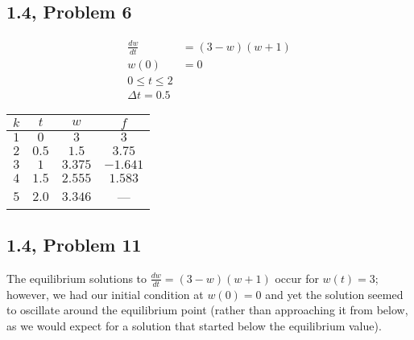 \documentclass[10pt]{mypackage}
\begin{document}
\subsection{1.4, Problem 6}%
\begin{align*}
  \frac{dw}{dt} &= (3-w)(w+1)\\
  w(0) &= 0\\
  0 \leq t \leq 2\\
  \Delta t = 0.5
\end{align*}
\begin{center}
  \begin{tabular}{c|c|c|c}
    $k$ & $t$ & $w$ & $f$\\
    \hline
    $1$ & $0$ & $3$ & $3$\\
    $2$ & $0.5$ & $1.5$ & $3.75$\\
    $3$ & $1$ & $3.375$ & $-1.641$\\
    $4$ & $1.5$ & $2.555$ & $1.583$\\
    $5$ & $2.0$ & $3.346$ & ---
  \end{tabular}
\end{center}
\begin{center}
\end{center}
\subsection{1.4, Problem 11}%
The equilibrium solutions to $\frac{dw}{dt} = (3-w)(w+1)$ occur for $w(t) = 3$; however, we had our initial condition at $w(0) = 0$ and yet the solution seemed to oscillate around the equilibrium point (rather than approaching it from below, as we would expect for a solution that started below the equilibrium value).
\end{document}
